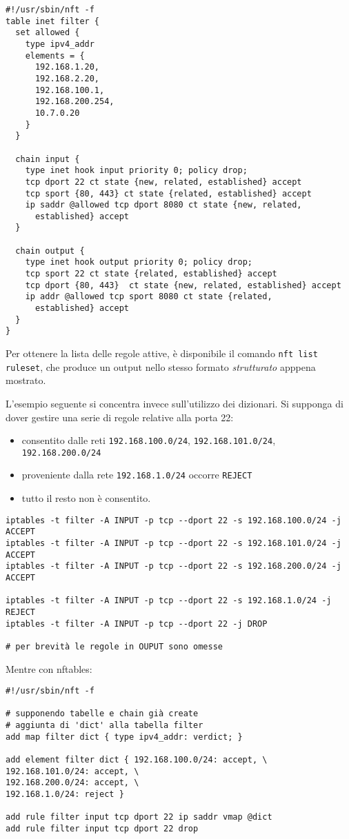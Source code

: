 \begin{verbatim}
#!/usr/sbin/nft -f
table inet filter {
  set allowed {
    type ipv4_addr
    elements = {
      192.168.1.20,
      192.168.2.20,
      192.168.100.1,
      192.168.200.254,
      10.7.0.20
    }
  }

  chain input {
    type inet hook input priority 0; policy drop;
    tcp dport 22 ct state {new, related, established} accept
    tcp sport {80, 443} ct state {related, established} accept
    ip saddr @allowed tcp dport 8080 ct state {new, related,
      established} accept
  }

  chain output {
    type inet hook output priority 0; policy drop;
    tcp sport 22 ct state {related, established} accept
    tcp dport {80, 443}  ct state {new, related, established} accept
    ip addr @allowed tcp sport 8080 ct state {related,
      established} accept
  }
}
\end{verbatim}
Per ottenere la lista delle regole attive, è disponibile il comando
\texttt{nft list ruleset}, che produce un output nello stesso formato \textit{strutturato}
apppena mostrato.

L'esempio seguente si concentra invece sull'utilizzo dei dizionari.
Si supponga di dover gestire una serie di regole relative alla porta 22:
\begin{itemize}
  \item consentito dalle reti \texttt{192.168.100.0/24}, \texttt{192.168.101.0/24},
  \texttt{192.168.200.0/24}
  \item proveniente dalla rete \texttt{192.168.1.0/24} occorre \texttt{REJECT}
  \item tutto il resto non è consentito.
\end{itemize}
\begin{verbatim}
iptables -t filter -A INPUT -p tcp --dport 22 -s 192.168.100.0/24 -j ACCEPT
iptables -t filter -A INPUT -p tcp --dport 22 -s 192.168.101.0/24 -j ACCEPT
iptables -t filter -A INPUT -p tcp --dport 22 -s 192.168.200.0/24 -j ACCEPT

iptables -t filter -A INPUT -p tcp --dport 22 -s 192.168.1.0/24 -j REJECT
iptables -t filter -A INPUT -p tcp --dport 22 -j DROP

# per brevità le regole in OUPUT sono omesse
\end{verbatim}
Mentre con nftables:
\begin{verbatim}
#!/usr/sbin/nft -f

# supponendo tabelle e chain già create
# aggiunta di 'dict' alla tabella filter
add map filter dict { type ipv4_addr: verdict; }

add element filter dict { 192.168.100.0/24: accept, \
192.168.101.0/24: accept, \
192.168.200.0/24: accept, \
192.168.1.0/24: reject }

add rule filter input tcp dport 22 ip saddr vmap @dict
add rule filter input tcp dport 22 drop
\end{verbatim}
